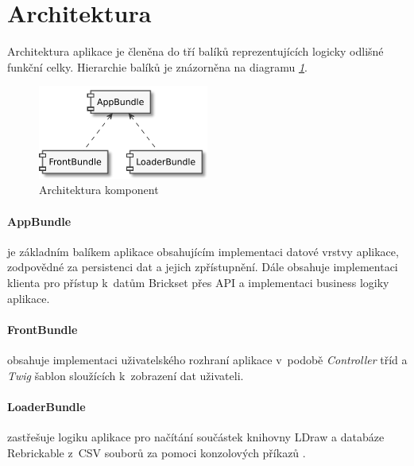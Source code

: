 \section{Architektura}
Architektura aplikace je členěna do tří balíků reprezentujících logicky odlišné funkční celky. Hierarchie balíků je znázorněna na diagramu \emph{\ref{diagram-bundles}}.

\begin{figure}[htbp]
    \centering
    \includegraphics[width=0.5\textwidth,height=\textheight,keepaspectratio]{pdfs/bundles}
    \caption{Architektura komponent\label{diagram-bundles}}
\end{figure}

\paragraph{AppBundle}  
je základním balíkem aplikace obsahujícím implementaci datové vrstvy aplikace, zodpovědné za persistenci dat a jejich zpřístupnění. Dále obsahuje implementaci klienta pro přístup k~datům Brickset přes API a implementaci business logiky aplikace.

\paragraph{FrontBundle} 
obsahuje implementaci uživatelského rozhraní aplikace v~podobě \textit{Controller} tříd a \textit{Twig} šablon sloužících k~zobrazení dat uživateli.

\paragraph{LoaderBundle} 
zastřešuje logiku aplikace pro načítání součástek knihovny LDraw a databáze Rebrickable z~\gls{CSV} souborů za pomoci konzolových příkazů \autocite{symfony:console}. 

